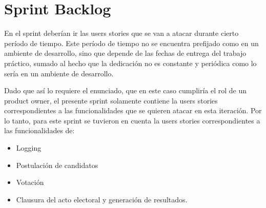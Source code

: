 \section{Sprint Backlog}

En el sprint deber\'ian ir las users stories que se van a atacar durante cierto per\'iodo de tiempo. 
Este per\'iodo de tiempo no se encuentra prefijado como en un ambiente de desarrollo, sino que depende de las fechas de entrega del trabajo pr\'actico, sumado al hecho que la dedicaci\'on no es constante y peri\'odica como lo ser\'ia en un ambiente de desarrollo.

\bigskip

Dado que as\'i lo requiere el enunciado, que en este caso cumplir\'ia el rol de un product owner, el presente sprint solamente contiene la users stories correspondientes a las funcionalidades que se quieren atacar en esta iteraci\'on. Por lo tanto, para este sprint se tuvieron en cuenta la users stories correspondientes a las funcionalidades de:

\bigskip


\begin{itemize}
\item Logging
\item Postulaci\'on de candidatos
\item Votaci\'on
\item Clausura del acto electoral y generaci\'on de resultados.
\end{itemize}

  


